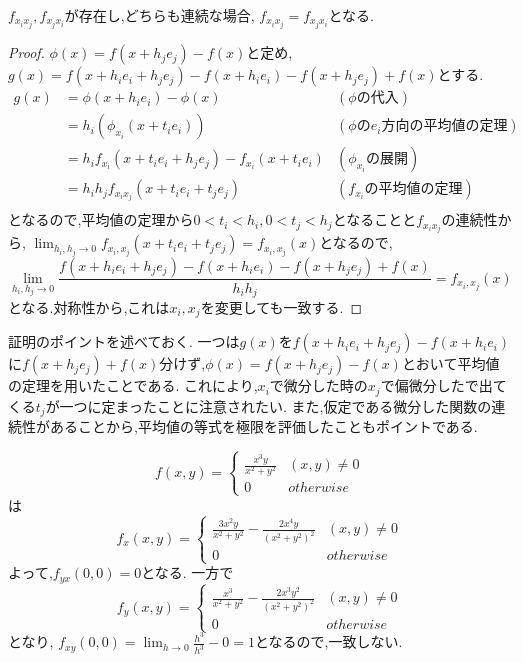 \begin{prop}
$f_{x_ix_j},f_{x_jx_i}$が存在し,どちらも連続な場合,
$f_{x_ix_j} = f_{x_jx_i}$となる.
\end{prop}
\begin{proof}
  $\phi(x) = f(x +h_je_j) - f(x)$と定め, $g(x)  = f(x+h_ie_i+h_je_j)- f(x+h_ie_i) - f(x+h_je_j) + f(x)$とする.
\begin{align*}
g(x) &= \phi(x+h_ie_i) - \phi(x) & (\phi \mbox{の代入})\\
     &= h_i(\phi_{x_i}(x+t_ie_i))  & (\phi \mbox{の}e_i\mbox{方向の平均値の定理})\\
     &= h_i f_{x_i}(x+t_ie_i+h_je_j) - f_{x_i}(x+t_ie_i)  & (\phi_{x_i}\mbox{の展開})\\
     &= h_ih_jf_{x_ix_j}(x+t_ie_i+t_je_j) & (f_{x_i}\mbox{の平均値の定理}) \\
\end{align*}
  となるので,平均値の定理から$0 < t_i<h_i,0 < t_j< h_j$となることと$f_{x_ix_j}$の連続性から,
  $\lim_{h_i,h_j \to 0}f_{x_i,x_j}(x+t_ie_i+t_je_j) = f_{x_i,x_j}(x)$となるので,
  \begin{equation*}
  \lim_{h_i, h_j \to 0} \frac{f(x+h_ie_i+h_je_j)- f(x+h_ie_i) - f(x+h_je_j) + f(x)}{h_ih_j} = f_{x_i,x_j}(x)
  \end{equation*}
  となる.対称性から,これは$x_i, x_j$を変更しても一致する.
\end{proof}


\begin{rem}
証明のポイントを述べておく.
一つは$g(x)$を$f(x+h_ie_i+h_je_j)- f(x+h_ie_i)$に$f(x+h_je_j) + f(x)$分けず,$\phi(x) = f(x +h_je_j) - f(x)$とおいて平均値の定理を用いたことである.
これにより,$x_i$で微分した時の$x_j$で偏微分したで出てくる$t_j$が一つに定まったことに注意されたい.
また,仮定である微分した関数の連続性があることから,平均値の等式を極限を評価したこともポイントである.
\end{rem}

\begin{epl}
\begin{equation*}
    f(x, y) = \begin{cases}
     \frac{x^3y}{x^2 + y^2}  & (x,y) \neq 0 \\
     0 & otherwise
   \end{cases}
\end{equation*}
は
\begin{equation*}
    f_x(x, y) = \begin{cases}
     \frac{3x^2y}{x^2 + y^2} - \frac{2x^4y}{(x^2 + y^2)^2}  & (x,y) \neq 0 \\
     0 & otherwise
   \end{cases}
\end{equation*}
よって,$f_{yx}(0, 0) = 0$となる.
一方で
\begin{equation*}
    f_y(x, y) = \begin{cases}
     \frac{x^3}{x^2 + y^2} - \frac{2x^3y^2}{(x^2 + y^2)^2}  & (x,y) \neq 0 \\
     0 & otherwise
   \end{cases}
\end{equation*}
となり,
$f_{xy}(0, 0) = \lim_{h \to 0} \frac{h^3}{h^3} - 0 = 1$となるので,一致しない.
\end{epl}

